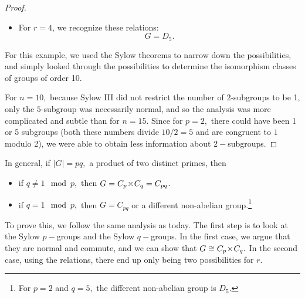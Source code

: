 \begin{proof}
\begin{itemize}
    \item For $r = 4$, we recognize these relations: \[G = D_5.\]

\end{itemize}

For this example, we used the Sylow theorems to narrow down the possibilities, and simply looked through the possibilities to determine the isomorphism classes of groups of order 10. 

For $n = 10,$ because Sylow III did not restrict the number of $2$-subgroups to be 1, only the $5$-subgroup was necessarily normal, and so the analysis was more complicated and subtle than for $n = 15$. Since for $p = 2,$ there could have been 1 or 5 subgroups (both these numbers divide $10/2 = 5$ and are congruent to $1$ modulo 2), we were able to obtain less information about $2-$subgroups. 

\end{proof}

In general, if $|G| = pq,$ a product of two distinct primes, then 
\begin{itemize}
    \item if $q \neq 1 \mod p,$ then $G = C_p \hspace{0.05em}{\times}\hspace{0.05em} C_q = C_{pq}$.
    
    \item if $q = 1 \mod p,$ then $G = C_{pq}$ or a different non-abelian group.\footnote{For $p = 2$ and $q = 5,$ the different non-abelian group is $D_5.$}

\end{itemize}
To prove this, we follow the same analysis as today. The first step is to look at the Sylow $p-$groups and the Sylow $q-$groups. In the first case, we argue that they are normal and commute, and we can show that $G \cong C_p \hspace{0.05em}{\times}\hspace{0.05em} C_q.$ In the second case, using the relations, there end up only being two possibilities for $r.$

\newpage